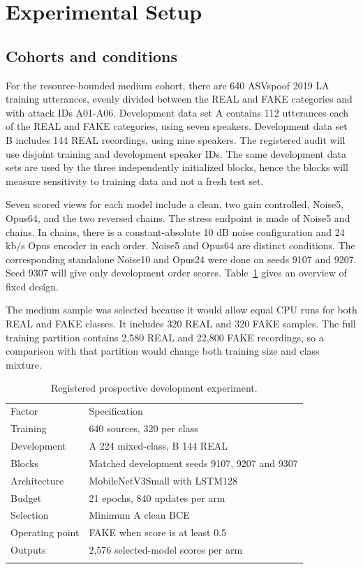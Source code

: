 \section{Experimental Setup}\label{sec:setup}

\subsection{Cohorts and conditions}

For the resource-bounded medium cohort, there are 640 ASVspoof 2019 LA training utterances, evenly divided between the REAL and FAKE categories and with attack IDs A01-A06. Development data set A contains 112 utterances each of the REAL and FAKE categories, using seven speakers. Development data set B includes 144 REAL recordings, using nine speakers. The registered audit will use disjoint training and development speaker IDs. The same development data sets are used by the three independently initialized blocks, hence the blocks will measure sensitivity to training data and not a fresh test set.

Seven scored views for each model include a clean, two gain controlled, Noise5, Opus64, and the two reversed chains. The stress endpoint is made of Noise5 and chains. In chains, there is a constant-absolute 10 dB noise configuration and 24 kb/s Opus encoder in each order. Noise5 and Opus64 are distinct conditions. The corresponding standalone Noise10 and Opus24 were done on seeds 9107 and 9207. Seed 9307 will give only development order scores. Table~\ref{tab:design} gives an overview of fixed design.

The medium sample was selected because it would allow equal CPU runs for both REAL and FAKE classes. It includes 320 REAL and 320 FAKE samples. The full training partition contains 2,580 REAL and 22,800 FAKE recordings, so a comparison with that partition would change both training size and class mixture.

\begin{table}[t]
\caption{Registered prospective development experiment.}\label{tab:design}
\centering
\begin{tabular}{@{}lp{}@{}}
\toprule
Factor & Specification\\
\colrule
Training & 640 sources, 320 per class\\
Development & A 224 mixed-class, B 144 REAL\\
Blocks & Matched development seeds 9107, 9207 and 9307\\
Architecture & MobileNetV3Small with LSTM128\\
Budget & 21 epochs, 840 updates per arm\\
Selection & Minimum A clean BCE\\
Operating point & FAKE when score is at least 0.5\\
Outputs & 2,576 selected-model scores per arm\\
\botrule
\end{tabular}
\end{table}

